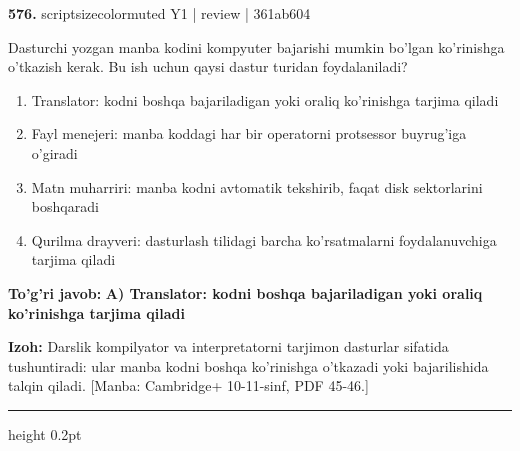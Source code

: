 \documentclass[10pt,a4paper]{article}
\begin{document}
{\bfseries\sffamily\color{ink} 576.} {scriptsizecolor{muted} Y1 | review | 361ab604}
\par
Dasturchi yozgan manba kodini kompyuter bajarishi mumkin bo'lgan ko'rinishga o'tkazish kerak. Bu ish uchun qaysi dastur turidan foydalaniladi?
\begin{enumerate}[label=\Alph*),leftmargin=9mm]
\item Translator: kodni boshqa bajariladigan yoki oraliq ko'rinishga tarjima qiladi
\item Fayl menejeri: manba koddagi har bir operatorni protsessor buyrug'iga o'giradi
\item Matn muharriri: manba kodni avtomatik tekshirib, faqat disk sektorlarini boshqaradi
\item Qurilma drayveri: dasturlash tilidagi barcha ko'rsatmalarni foydalanuvchiga tarjima qiladi
\end{enumerate}
\begin{tcolorbox}[enhanced,breakable,colback=teal!4,colframe=teal!60!black,boxrule=0.45pt,arc=1.2mm,left=2.7mm,right=2.7mm,top=1.8mm,bottom=1.8mm,before skip=2mm,after skip=2mm]
{\bfseries\sffamily\color{teal}To'g'ri javob:} \textbf{A) Translator: kodni boshqa bajariladigan yoki oraliq ko'rinishga tarjima qiladi}
\par\smallskip
{\bfseries Izoh:} Darslik kompilyator va interpretatorni tarjimon dasturlar sifatida tushuntiradi: ular manba kodni boshqa ko'rinishga o'tkazadi yoki bajarilishida talqin qiladi. [Manba: Cambridge+ 10-11-sinf, PDF 45-46.]
\end{tcolorbox}
\vspace{2mm}\hrule height 0.2pt\vspace{3mm}
\end{document}
